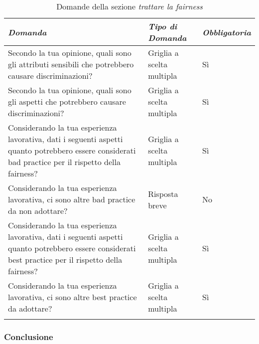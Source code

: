 \begin{longtable}{| p{} | p{} | p{} |} 
\hline\textbf{\textit{Domanda}} & \textbf{\textit{Tipo di Domanda}} & \textbf{\textit{Obbligatoria}}\\
\hline
\endhead 

\hline 
Secondo la tua opinione, quali sono gli attributi sensibili che potrebbero causare discriminazioni?

& Griglia a scelta multipla

& Sì 

\\ \hline
\rowcolor{Gray!30}
Secondo la tua opinione, quali sono gli aspetti che potrebbero causare discriminazioni?

& Griglia a scelta multipla

& Sì 

\\ \hline
Considerando la tua esperienza lavorativa, dati i seguenti aspetti quanto potrebbero essere considerati bad practice per il rispetto della fairness?

& Griglia a scelta multipla

& Sì 

\\ \hline
\rowcolor{Gray!30}
Considerando la tua esperienza lavorativa, ci sono altre bad practice da non adottare?

&  Risposta breve

& No

\\ \hline 
Considerando la tua esperienza lavorativa, dati i seguenti aspetti quanto potrebbero essere considerati best practice per il rispetto della fairness?

& Griglia a scelta multipla

& Sì 

\\ \hline
\rowcolor{Gray!30}
Considerando la tua esperienza lavorativa, ci sono altre best practice da adottare?

& Griglia a scelta multipla

& Sì 

\\ \hline
\caption{Domande della sezione \emph{trattare la fairness}} %
\label{tab:myfirstlongtable}
\end{longtable}

\subsubsection{Conclusione}

